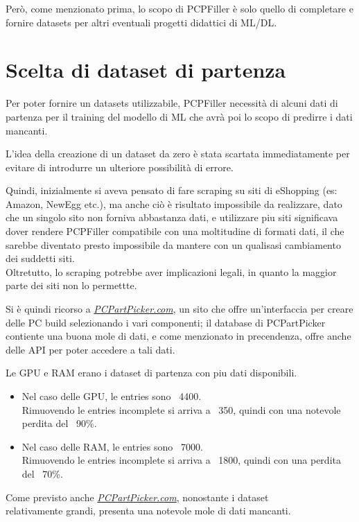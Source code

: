 \documentclass[12pt]{report}
\begin{document}
Però, come menzionato prima, lo scopo di PCPFiller è solo quello di completare e fornire datasets per
altri eventuali progetti didattici di ML/DL.

\newpage
\section{Scelta di dataset di partenza}
Per poter fornire un datasets utilizzabile, PCPFiller necessità di alcuni dati di partenza per il
training del modello di ML che avrà poi lo scopo di predirre i dati mancanti.

L'idea della creazione di un dataset da zero è stata scartata immediatamente per evitare di introdurre
un ulteriore possibilità di errore.

Quindi, inizialmente si aveva pensato di fare scraping su siti di eShopping (es: Amazon, NewEgg etc.),
ma anche ciò è risultato impossibile da realizzare, dato che un singolo sito non forniva abbastanza dati,
e utilizzare piu siti significava dover rendere PCPFiller compatibile con una moltitudine di formati
dati, il che sarebbe diventato presto impossibile da mantere con un qualisasi cambiamento dei suddetti siti.\\
Oltretutto, lo scraping potrebbe aver implicazioni legali, in quanto la maggior parte dei siti non lo permettte.

Si è quindi ricorso a \underline{\textit{PCPartPicker.com}}, un sito che offre un'interfaccia per
creare delle PC build selezionando i vari componenti; il database di PCPartPicker contiente una buona
mole di dati, e come menzionato in precendenza, offre anche delle API per poter accedere a tali dati.

Le GPU e RAM erano i dataset di partenza con piu dati disponibili.
\begin{itemize}
	\item Nel caso delle GPU, le entries sono ~4400.\\
		Rimuovendo le entries incomplete si arriva a ~350, quindi con una notevole perdita del ~90\%.
	\item Nel caso delle RAM, le entries sono ~7000.\\
		Rimuovendo le entries incomplete si arriva a ~1800, quindi con una perdita del ~70\%.
\end{itemize}
Come previsto anche \underline{\textit{PCPartPicker.com}}, nonostante i dataset \\relativamente grandi,
presenta una notevole mole di dati mancanti.
\end{document}
